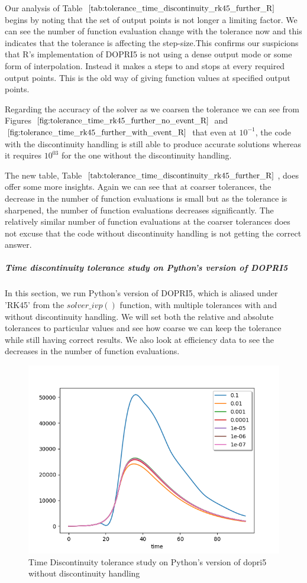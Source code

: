 Our analysis of Table $\ref{tab:tolerance_time_discontinuity_rk45_further_R}$ begins by noting that the set of output points is not longer a limiting factor. We can see the number of function evaluation change with the tolerance now and this indicates that the tolerance is affecting the step-size.This confirms our suspicions that R's implementation of DOPRI5 is not using a dense output mode or some form of interpolation. Instead it makes a steps to and stops at every required output points. This is the old way of giving function values at specified output points. 

Regarding the accuracy of the solver as we coarsen the tolerance we can see from Figures $\ref{fig:tolerance_time_rk45_further_no_event_R}$ and $\ref{fig:tolerance_time_rk45_further_with_event_R}$ that even at $10^{-1}$, the code with the discontinuity handling is still able to produce accurate solutions whereas it requires $10^{03}$ for the one without the discontinuity handling.

The new table, Table $\ref{tab:tolerance_time_discontinuity_rk45_further_R}$, does offer some more insights. Again we can see that at coarser tolerances, the decrease in the number of function evaluations is small but as the tolerance is sharpened, the number of function evaluations decreases significantly. The relatively similar number of function evaluations at the coarser tolerances does not excuse that the code without discontinuity handling is not getting the correct answer. 

\subparagraph{Time discontinuity tolerance study on Python's version of DOPRI5}
In this section, we run Python's version of DOPRI5, which is aliased under 'RK45' from the $solver\_ivp()$ function, with multiple tolerances with and without discontinuity handling. We will set both the relative and absolute tolerances to particular values and see how coarse we can keep the tolerance while still having correct results. We also look at efficiency data to see the decreases in the number of function evaluations.

\begin{figure}[h]
	\centering
	\includegraphics[width=0.7\linewidth]{./figures/tolerance_time_rk45_no_event_py}
	\caption{Time Discontinuity tolerance study on Python's version of dopri5 without discontinuity handling}
	\label{fig:tolerance_time_rk45_no_event_py}
\end{figure}

